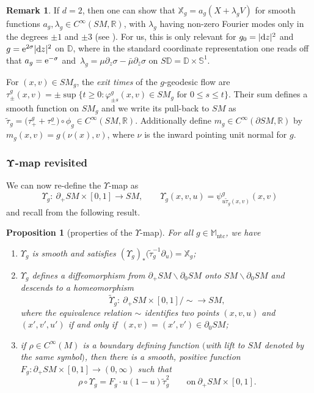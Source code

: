 \documentclass[pdftex]{sigma}
\numberwithin{equation}{section}
\newtheorem{Proposition}[Theorem]{Proposition}
\theoremstyle{definition}
\newtheorem{Remark}[Theorem]{Remark}
\newcommand{\R}{\mathbb{R}} %
\newcommand{\DD}{\mathbb{D}} %
\newcommand{\M}{\mathbb{M}}
\newcommand{\1}{{\bf 1}}
\newcommand{\ntc}{\mathrm{ntc}}
\begin{document}
\begin{Remark}\label{rmk_xpres}
If $d=2$, then one can show that $\mathbb X_g = a_g(X+\lambda_g V)$ for smooth functions $a_g,\lambda_g\in C^\infty(SM,\R)$, with $\lambda_g$ having non-zero Fourier modes only in the degrees $\pm 1$ and $\pm 3$ (see \cite[Section 3.1]{MePa20}). For us, this is only relevant for $g_0=|{\rm d}z|^2$ and $g={\rm e}^{2\sigma}|{\rm d}z|^2$ on $\DD$, where in the standard coordinate representation \cite[Lemma~3.5.6]{PSU23} one reads off that $a_g = {\rm e}^{-\sigma}$ and~${\lambda_g= \mu \partial_z \sigma - \bar \mu \partial_{\bar z}\sigma}$ on $S\DD = \DD\times \mathbb S^1$.
\end{Remark}

For $(x,v)\in SM_g$, the {\it exit times} of the $g$-geodesic flow are $\tau_\pm^g(x,v)=\pm \sup\{t\ge 0: \varphi^g_{\pm s}(x,v)\in SM_g \text{ for } 0\le s \le t\}$. Their sum defines a smooth function on $SM_g$ and we write its pull-back to $SM$ as
$\tilde \tau_g = \bigl(\tau_+^g+\tau_-^g\bigr)\circ \phi_g \in C^\infty(SM,\R)$.
Additionally define $m_g\in C^\infty(\partial SM,\R)$ by~${m_g(x,v)=g(\nu(x),v)}$, where $\nu$ is the inward pointing unit normal for $g$.

\subsubsection[Upsilon-map revisited]{$\boldsymbol{\Upsilon}$-map revisited}We can now re-define the $\Upsilon$-map as
\[
	\Upsilon_g\colon \ \partial_+SM \times [0,1]\rightarrow SM,\qquad \Upsilon_g(x,v,u)=\psi^g_{u\tilde\tau_g(x,v)}(x,v)
\]
and recall from \cite{MNP20} the following result.

\begin{Proposition}[properties of the $\Upsilon$-map]\label{propups} For all $g\in \M_\ntc$, we have
	\begin{enumerate}[label=\rm (\roman*)]\itemsep=0pt
	\item $\Upsilon_g$ is smooth and satisfies $(\Upsilon_g)_*\bigl(\tilde\tau_g^{-1}\partial_u\bigr) = \mathbb X_g$;
	
	\item $\Upsilon_g$ defines a diffeomorphism from $\partial_+SM\backslash \partial_0SM$ onto $SM\backslash \partial_0SM$ and descends to a homeomorphism
	\[
		\tilde \Upsilon_g\colon\ \partial_+SM\times [0,1]/{\sim} \rightarrow SM,
	\]
	where the equivalence relation $\sim$ identifies two points $(x,v,u)$ and $(x',v',u')$ if and only if~${(x,v)=(x',v')\in \partial_0SM}$;
	
	\item if $\rho\in C^\infty(M)$ is a boundary defining function $($with lift to $SM$ denoted by the same symbol$)$, then there is a smooth, positive function $F_g\colon \partial_+SM\times [0,1]\rightarrow (0,\infty)$ such that
	\[
	\rho \circ\Upsilon_g =F_g
	\cdot u(1-u)\tilde \tau_g^2\qquad \text{on} \  \partial_+SM\times [0,1].
	\]
	\end{enumerate}
\end{Proposition}
\end{document}
